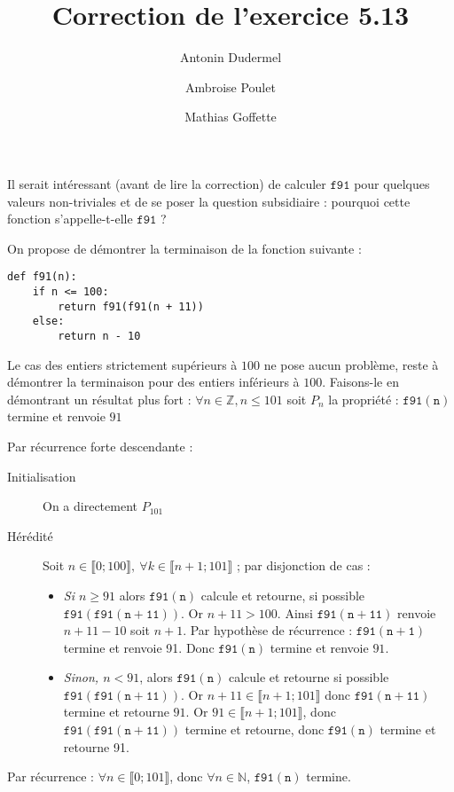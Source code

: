 \documentclass[11pt,a4paper]{article}
\title{Correction de l'exercice 5.13}
\date{}
\author{Antonin Dudermel \and Ambroise Poulet \and Mathias Goffette}
\begin{document}

\maketitle

\begin{it}
Il serait intéressant (avant de lire la correction) de calculer \;$\mathtt{f91}$ pour quelques valeurs non-triviales et de se poser la question subsidiaire : pourquoi cette fonction s'appelle-t-elle \;$\mathtt{f91}$ ?
\end{it}
\par
On propose de démontrer la terminaison de la fonction suivante :

\begin{lstlisting}
def f91(n):
    if n <= 100:
        return f91(f91(n + 11))
    else:
        return n - 10
\end{lstlisting}

\par
Le cas des entiers strictement supérieurs à $100$ ne pose aucun problème, reste à démontrer la terminaison pour des entiers inférieurs à $100$.
Faisons-le en démontrant un résultat plus fort : $\forall n \in \mathbb{Z}, n\leq 101$ soit $P_n$ la propriété : \og{} $\mathtt{f91(n)}$ termine et renvoie $91$ \fg{}
\par
Par récurrence forte descendante :\\
\begin{description}
\item[Initialisation] \quad On a directement $P_{101}$
\item[Hérédité] \quad Soit $n\in \llbracket 0;100\rrbracket ,~ \forall k \in \llbracket n+1;101\rrbracket$ ; par disjonction de cas : 
\begin{itemize}[\textbullet]
	\item {\itshape Si $n\geqslant 91$ } alors $\mathtt{f91(n)}$ calcule et retourne, si possible $\mathtt{f91(f91(n+11))}$. Or $n+11 > 100$. Ainsi $\mathtt{f91(n+11)}$ renvoie $n+11-10$ soit $n+1$. Par hypothèse de récurrence : $\mathtt{f91(n+1)}$ termine et renvoie 91. Donc $\mathtt{f91(n)}$ termine et renvoie $91$.
	\item {\itshape Sinon, $n < 91$}, alors $\mathtt{f91(n)}$ calcule et retourne si possible $\mathtt{f91(f91(n+11))}$. Or $n+11\in \llbracket n+1;101 \rrbracket$ donc $\mathtt{f91(n+11)}$ termine et retourne $91$. Or $91 \in \llbracket n+1;101 \rrbracket$, donc $\mathtt{f91(f91(n+11))}$ termine et retourne, donc $\mathtt{f91(n)}$ termine et retourne 91.
\end{itemize}
\end{description}
Par récurrence : $\forall n \in \llbracket 0;101 \rrbracket$, donc $\forall n \in \mathbb{N}$, $\mathtt{f91(n)}$ termine.
\end{document}
